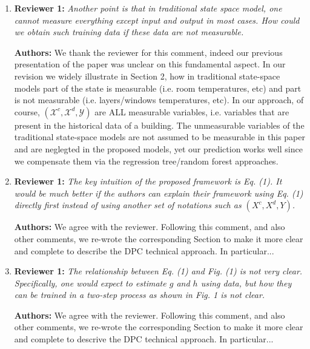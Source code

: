\documentclass{article}
\begin{document}
\begin{enumerate}
\begin{itemize}
	\end{itemize}



\item \textbf{Reviewer 1:} \textit{Another point is that in traditional state space model, one cannot measure everything except input and output in most cases. How could we obtain such training data if these data are not measurable.}



\textbf{Authors:} We thank the reviewer for this comment, indeed our previous presentation of the paper was unclear on this fundamental aspect. In our revision we widely illustrate in Section 2, how in traditional state-space models part of the state is measurable (i.e. room temperatures, etc) and part is not measurable (i.e. layers/windows temperatures, etc). In our approach, of course, $(\mathcal{X}^c, \mathcal{X}^d, \mathcal{Y})$ are ALL measurable variables, i.e. variables that are present in the historical data of a building. The unmeasurable variables of the traditional state-space models are not assumed to be measurable in this paper and are neglegted in the proposed models, yet our prediction works well since we compensate them via the regression tree/random forest approaches.



\item \textbf{Reviewer 1:} \textit{The key intuition of the proposed framework is Eq. (1). It would be much better if the authors can explain their framework using Eq. (1) directly first instead of using another set of notations such as $(X^c, X^d, Y)$.}



\textbf{Authors:} We agree with the reviewer. Following this comment, and also other comments, we re-wrote the corresponding Section to make it more clear and complete to describe the DPC technical approach. In particular...



\item \textbf{Reviewer 1:} \textit{The relationship between Eq. (1) and Fig. (1) is not very clear. Specifically, one would expect to estimate $g$ and $h$ using data, but how they can be trained in a two-step process as shown in Fig. 1 is not clear.}



\textbf{Authors:} We agree with the reviewer. Following this comment, and also other comments, we re-wrote the corresponding Section to make it more clear and complete to descrive the DPC technical approach. In particular...



\end{enumerate}
\end{document}
